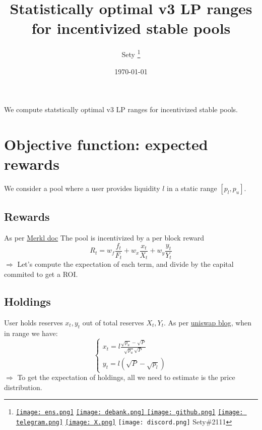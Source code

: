 \documentclass[12pt]{article}
\begin{document}
\graphicspath{{/home/user/Documents/tex/assets/}}
\title{Statistically optimal v3 LP ranges for incentivized stable pools}
\author{Sety \footnote{
      \href{https://etherscan.io/address/0xFaf2A8b5fa78cA2786cEf5F7e19f6942EC7cB531}{\texttt{[image: ens.png]}}
      \href{https://debank.com/profile/0xfaf2a8b5fa78ca2786cef5f7e19f6942ec7cb531}{\texttt{[image: debank.png]} }
      \href{https://github.com/Sety-project}{\texttt{[image: github.png]}}
      \href{https://t.me/daviidarr}{\texttt{[image: telegram.png]}}
      \href{https://X.com/Sety08052022}{\texttt{[image: X.png]}}
      \texttt{[image: discord.png]} Sety\#2111
      }}

\date{\today}
\maketitle

\abstract We compute statstically optimal v3 LP ranges for incentivized stable pools. 

\section{Objective function: expected rewards}
We  consider a pool where a user provides liquidity $l$ in a static range $[p_l, p_u]$.

\subsection{Rewards}
\indent As per \href{https://docs.angle.money/merkl/introduction#customizable-distribution-formula}{Merkl doc} The pool is incentivized by a per block reward 
\begin{equation} 
R_t = w_f \frac{f_t}{F_t} + w_x \frac{x_t}{X_t} + w_y \frac{y_t}{Y_t}
\end{equation}
$\Rightarrow$ Let's compute the expectation of each term, and divide by the capital commited to get a ROI.
\subsection{Holdings}
User holds reserves $x_t, y_t$ out of total reserves $X_t, Y_t$. 
As per \href{https://blog.uniswap.org/uniswap-v3-math-primer-2}{uniswap blog}, when in range we have:
\[
\begin{cases}
      x_t = l \frac{\sqrt{p_u}-\sqrt{P}}{\sqrt{p_u}\sqrt{P}} \\
      y_t = l (\sqrt{P}-\sqrt{p_l})
\end{cases}
\]
$\Rightarrow$ To get the expectation of holdings, all we need to estimate is the price distribution.
\end{document}
